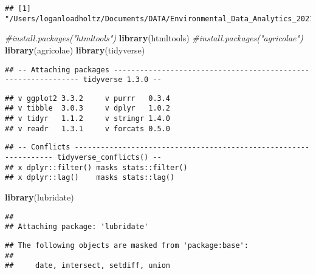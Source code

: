 \documentclass[
]{article}
\newenvironment{Shaded}{\begin{snugshade}}{\end{snugshade}}
\newcommand{\CommentTok}[1]{\textcolor[rgb]{0.56,0.35,0.01}{\textit{#1}}}
\newcommand{\KeywordTok}[1]{\textcolor[rgb]{0.13,0.29,0.53}{\textbf{#1}}}
\newcommand{\NormalTok}[1]{#1}
\begin{document}
\begin{Shaded}
\end{Shaded}

\begin{verbatim}
## [1] "/Users/loganloadholtz/Documents/DATA/Environmental_Data_Analytics_2021"
\end{verbatim}

\begin{Shaded}
\begin{Highlighting}[]
\CommentTok{#install.packages("htmltools")}
\KeywordTok{library}\NormalTok{(htmltools)}
\CommentTok{#install.packages("agricolae")}
\KeywordTok{library}\NormalTok{(agricolae)}
\KeywordTok{library}\NormalTok{(tidyverse)}
\end{Highlighting}
\end{Shaded}

\begin{verbatim}
## -- Attaching packages -------------------------------------------------------------- tidyverse 1.3.0 --
\end{verbatim}

\begin{verbatim}
## v ggplot2 3.3.2     v purrr   0.3.4
## v tibble  3.0.3     v dplyr   1.0.2
## v tidyr   1.1.2     v stringr 1.4.0
## v readr   1.3.1     v forcats 0.5.0
\end{verbatim}

\begin{verbatim}
## -- Conflicts ----------------------------------------------------------------- tidyverse_conflicts() --
## x dplyr::filter() masks stats::filter()
## x dplyr::lag()    masks stats::lag()
\end{verbatim}

\begin{Shaded}
\begin{Highlighting}[]
\KeywordTok{library}\NormalTok{(lubridate)}
\end{Highlighting}
\end{Shaded}

\begin{verbatim}
## 
## Attaching package: 'lubridate'
\end{verbatim}

\begin{verbatim}
## The following objects are masked from 'package:base':
## 
##     date, intersect, setdiff, union
\end{verbatim}
\end{document}
